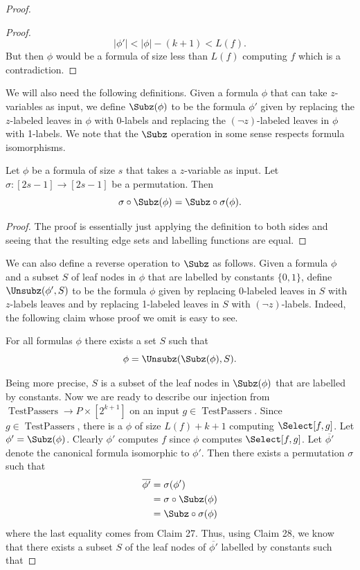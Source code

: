 \begin{proof}
\begin{proof}
\[|\phi'|<|\phi|-(k+1)<L(f).\]
But then $\phi$ would be a formula of size less than $L(f)$ computing $f$ which is a contradiction.
\end{proof}
We will also need the following definitions. Given a formula $\phi$ that can take $z$-variables as input, we define $\Subz(\phi)$ to be the formula $\phi'$ given by replacing the $z$-labeled leaves in $\phi$ with 0-labels and replacing the $(\neg z)$-labeled leaves in $\phi$ with 1-labels.
We note that the $\Subz$ operation in some sense respects formula isomorphisms.
\begin{ntclaim}
Let $\phi$ be a formula of size $s$ that takes a $z$-variable as input. Let $\sigma:[2s-1]\to[2s-1]$ be a permutation. Then
\[\sigma\circ\Subz(\phi)=\Subz\circ\sigma(\phi).\]
\end{ntclaim}
\begin{proof}
The proof is essentially just applying the definition to both sides and seeing that the resulting edge sets and labelling functions are equal.
\end{proof}
We can also define a reverse operation to $\Subz$ as follows. Given a formula $\phi$ and a subset $S$ of leaf nodes in $\phi$ that are labelled by constants $\{0,1\}$, define $\Unsubz(\phi',S)$ to be the formula $\phi$ given by replacing 0-labeled leaves in $S$ with $z$-labels leaves and by replacing 1-labeled leaves in $S$ with $(\neg z)$-labels.
Indeed, the following claim whose proof we omit is easy to see.
\begin{ntclaim}
For all formulas $\phi$ there exists a set $S$ such that
\[\phi=\Unsubz(\Subz(\phi),S).\]
\end{ntclaim}
Being more precise, $S$ is a subset of the leaf nodes in $\Subz(\phi)$ that are labelled by constants.
Now we are ready to describe our injection from $\operatorname{TestPassers}\to P\times[2^{k+1}]$ on an input $g\in\operatorname{TestPassers}$. Since $g\in\operatorname{TestPassers}$, there is a $\phi$ of size $L(f)+k+1$ computing $\Select[f,g]$. Let $\phi'=\Subz(\phi)$. Clearly $\phi'$ computes $f$ since $\phi$ computes $\Select[f,g]$. Let $\overline{\phi'}$ denote the canonical formula isomorphic to $\phi'$. Then there exists a permutation $\sigma$ such that
\begin{align*}\overline{\phi'}&=\sigma(\phi')\\&=\sigma\circ\Subz(\phi)\\&=\Subz\circ\sigma(\phi)\end{align*}
where the last equality comes from Claim 27. Thus, using Claim 28, we know that there exists a subset $S$ of the leaf nodes of $\overline{\phi'}$ labelled by constants such that

\end{proof}
